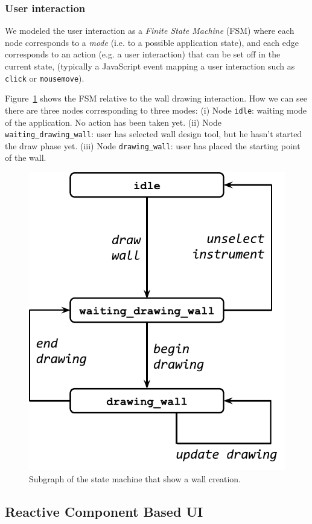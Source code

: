 \subsubsection*{User interaction} We modeled the user interaction as a \emph{Finite State Machine} (FSM) where each node corresponds to a \emph{mode} (i.e. to a possible application state), and each edge corresponds to an action (e.g. a user interaction) that can be set off in the current state, (typically a JavaScript event mapping a user interaction such as \texttt{click} or \texttt{mousemove}). 

Figure~\ref{fig_uc_draw_wall} shows the FSM relative to the wall drawing interaction. How we can see there are three nodes corresponding to three modes: (i) Node \texttt{idle}: waiting mode of the application. No action has been taken yet. (ii) Node \texttt{waiting\_drawing\_wall}: user has selected wall design tool, but he hasn't started the draw phase yet. (iii) Node \texttt{drawing\_wall}: user has placed the starting point of the wall.


\begin{figure}[!t]
\centering
\includegraphics[width=0.6\linewidth]{contents/images/uc_draw_wall}

\caption{Subgraph of the state machine that show a wall creation.}
\label{fig_uc_draw_wall}
\end{figure}



\subsection{Reactive Component Based UI}

